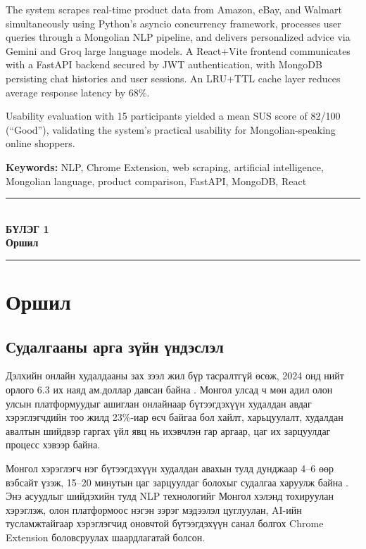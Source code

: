 \documentclass[12pt,a4paper]{report}
\newcommand{\chappage}[2]{%
  \clearpage
  \thispagestyle{empty}
  \null\vfill
  \begin{center}
    \rule{0.60\textwidth}{0.8pt}\\[18pt]
    {\fontsize{22}{28}\selectfont\bfseries БҮЛЭГ #1}\\[12pt]
    {\Large\bfseries #2}\\[18pt]
    \rule{0.60\textwidth}{0.8pt}
  \end{center}
  \vfill\null
  \clearpage}
\begin{document}
The system scrapes real-time product data from Amazon, eBay, and Walmart simultaneously using Python's asyncio concurrency framework, processes user queries through a Mongolian NLP pipeline, and delivers personalized advice via Gemini and Groq large language models. A React+Vite frontend communicates with a FastAPI backend secured by JWT authentication, with MongoDB persisting chat histories and user sessions. An LRU+TTL cache layer reduces average response latency by 68\%.

Usability evaluation with 15 participants yielded a mean SUS score of 82/100 (``Good''), validating the system's practical usability for Mongolian-speaking online shoppers.

\textbf{Keywords:} NLP, Chrome Extension, web scraping, artificial intelligence, Mongolian language, product comparison, FastAPI, MongoDB, React

\clearpage

\tableofcontents
\clearpage

\listoffigures
{}
\clearpage

\listoftables
{}
\clearpage

\chappage{1}{Оршил}

\chapter{Оршил}

\section{Судалгааны арга зүйн үндэслэл}

Дэлхийн онлайн худалдааны зах зээл жил бүр тасралтгүй өсөж, 2024 онд нийт орлого 6.3 их наяд ам.доллар давсан байна \cite{statista2024}. Монгол улсад ч мөн адил олон улсын платформуудыг ашиглан онлайнаар бүтээгдэхүүн худалдан авдаг хэрэглэгчдийн тоо жилд 23\%-иар өсч байгаа бол хайлт, харьцуулалт, худалдан авалтын шийдвэр гаргах үйл явц нь ихэвчлэн гар аргаар, цаг их зарцуулдаг процесс хэвээр байна.

Монгол хэрэглэгч нэг бүтээгдэхүүн худалдан авахын тулд дунджаар 4--6 өөр вэбсайт үзэж, 15--20 минутын цаг зарцуулдаг болохыг судалгаа харуулж байна \cite{mckinsey2023}. Энэ асуудлыг шийдэхийн тулд NLP технологийг Монгол хэлэнд тохируулан хэрэглэж, олон платформоос нэгэн зэрэг мэдээлэл цуглуулан, AI-ийн тусламжтайгаар хэрэглэгчид оновчтой бүтээгдэхүүн санал болгох Chrome Extension боловсруулах шаардлагатай болсон.
\end{document}
